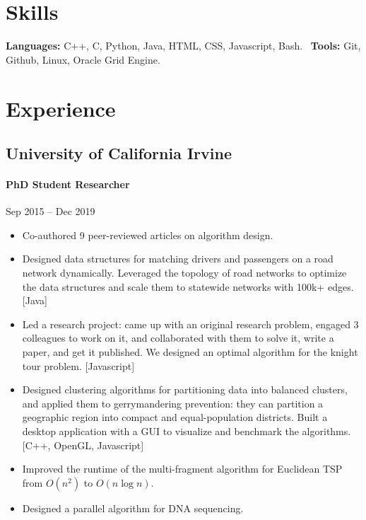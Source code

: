 \documentclass[letterpaper,10pt,oneside]{article}
\begin{document}
\section*{Skills}
\textbf{Languages:} C++, C, Python, Java, HTML, CSS, Javascript, Bash.~
\textbf{Tools:} Git, Github, Linux, Oracle Grid Engine.

\section*{Experience}
\subsection*{University of California Irvine}
\vspace{-3px}
\paragraph*{PhD Student Researcher} \hfill Sep 2015 -- Dec 2019

\vspace{-1px}
\begin{itemize}[leftmargin=15px]
	\item Co-authored 9 peer-reviewed articles on algorithm design.
	\item Designed data structures for matching drivers and passengers on a road network dynamically. Leveraged the topology of road networks to optimize the data structures and scale them to statewide networks with 100k+ edges. [Java]   
	\item Led a research project: came up with an original research problem, engaged 3 colleagues to work on it, and collaborated with them to solve it, write a paper, and get it published. We designed an optimal algorithm for the knight tour problem. [Javascript]
	\item Designed clustering algorithms for partitioning data into balanced clusters, and applied them to gerrymandering prevention: they can partition a geographic region into compact and equal-population districts. Built a desktop application with a GUI to visualize and benchmark the algorithms. [C++, OpenGL, Javascript]
	\item Improved the runtime of the multi-fragment algorithm for Euclidean TSP from $O(n^2)$ to $O(n\log n)$.
	\item Designed a parallel algorithm for DNA sequencing.
\end{itemize}
\end{document}
